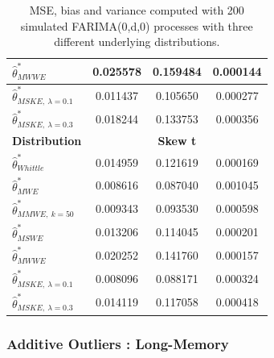 \documentclass[
  11pt,
]{article}
\begin{document}
\begin{table}[]
\begin{tabular}{|l|c|c|c|}
$\hat \theta^*_{MWWE}$                                        & 0.025578             & 0.159484              & 0.000144             \\ \hline
$\hat \theta^*_{MSKE, \ \lambda = 0.1}$                      & 0.011437             & 0.105650              & 0.000277             \\ \hline
$\hat \theta^*_{MSKE, \ \lambda = 0.3}$                       & 0.018244             & 0.133753              & 0.000356             \\ \hline
\multicolumn{1}{|c|}{\textbf{Distribution}}                   & \multicolumn{3}{c|}{\textbf{Skew t}}                                \\ \hline
$\hat \theta^*_{Whittle}$                                     & 0.014959             & 0.121619              & 0.000169             \\ \hline
$\hat \theta^*_{MWE}$                                         & 0.008616             & 0.087040              & 0.001045             \\ \hline
$\hat \theta^*_{MMWE, \ k = 50}$                              & 0.009343             & 0.093530              & 0.000598             \\ \hline
$\hat \theta^*_{MSWE}$                                        & 0.013206             & 0.114045              & 0.000201             \\ \hline
$\hat \theta^*_{MWWE}$                                        & 0.020252             & 0.141760              & 0.000157             \\ \hline
$\hat \theta^*_{MSKE, \ \lambda = 0.1}$                        & 0.008096             & 0.088171              & 0.000324             \\ \hline
$\hat \theta^*_{MSKE, \ \lambda = 0.3}$                       & 0.014119             & 0.117058              & 0.000418             \\ \hline
\end{tabular}
\caption{MSE, bias and variance computed with 200 simulated FARIMA(0,d,0) processes with three different underlying distributions.}
\label{tab:mse_farima}
\end{table}

\pagebreak

\hypertarget{additive-outliers-long-memory}{%
\subsubsection{Additive Outliers :
Long-Memory}\label{additive-outliers-long-memory}}
\end{document}

